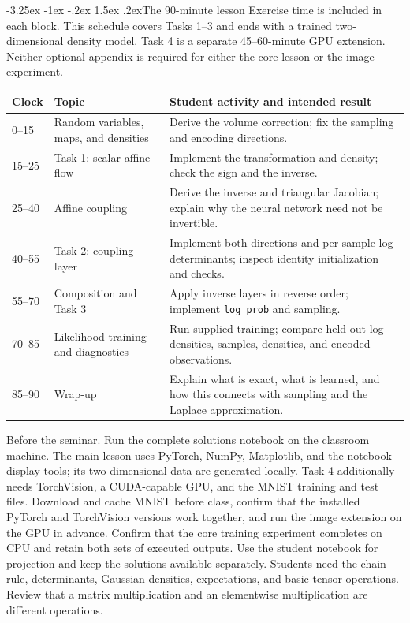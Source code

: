 \documentclass[11pt,a4paper]{article}
\makeatletter
\renewcommand\subsection{\@startsection{subsection}{2}{\z@}%
  {-3.25ex \@plus -1ex \@minus -.2ex}%
  {1.5ex \@plus .2ex}{\normalfont\large}}
\makeatother
\begin{document}
\subsection{The 90-minute lesson}
Exercise time is included in each block. This schedule covers Tasks 1--3 and
ends with a trained two-dimensional density model. Task 4 is a separate
45--60-minute GPU extension. Neither optional appendix is required for either
the core lesson or the image experiment.
\begin{center}
\begin{tabular}{@{}p{15mm}p{52mm}p{89mm}@{}}
\toprule
Clock & Topic & Student activity and intended result \\
\midrule
0--15 & Random variables, maps, and densities & Derive the volume correction;
fix the sampling and encoding directions. \\
15--25 & Task 1: scalar affine flow & Implement the transformation and density;
check the sign and the inverse. \\
25--40 & Affine coupling & Derive the inverse and triangular Jacobian;
explain why the neural network need not be invertible. \\
40--55 & Task 2: coupling layer & Implement both directions and per-sample
log determinants; inspect identity initialization and checks. \\
55--70 & Composition and Task 3 & {\raggedright Apply inverse layers in reverse order; implement
\texttt{log\_prob} and sampling.\par} \\
70--85 & Likelihood training and diagnostics & Run supplied training;
compare held-out log densities, samples, densities, and encoded observations. \\
85--90 & Wrap-up & Explain what is exact, what is learned, and how this
connects with sampling and the Laplace approximation. \\
\bottomrule
\end{tabular}
\end{center}

Before the seminar. Run the complete solutions notebook on the
classroom machine. The main lesson uses PyTorch, NumPy, Matplotlib, and the
notebook display tools; its two-dimensional data are generated locally.
Task 4 additionally needs TorchVision, a CUDA-capable GPU, and the MNIST
training and test files. Download and cache MNIST before class, confirm that
the installed PyTorch and TorchVision versions work together, and run the image
extension on the GPU in advance. Confirm that the core training experiment
completes on CPU and retain both sets of executed outputs. Use the
student notebook for projection and keep the solutions available separately.
Students need the chain rule, determinants, Gaussian densities, expectations,
and basic tensor operations. Review that a matrix multiplication and an
elementwise multiplication are different operations.
\end{document}
